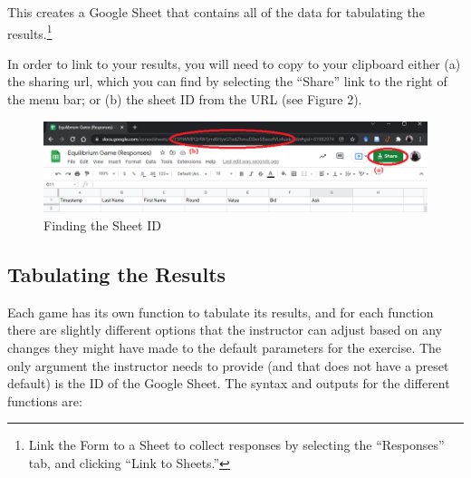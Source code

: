 \documentclass[
]{article}
\begin{document}
This creates a Google Sheet that contains all of the data for tabulating
the results.\footnote{Link the Form to a Sheet to collect responses by
  selecting the ``Responses'' tab, and clicking ``Link to Sheets.''}

In order to link to your results, you will need to copy to your
clipboard either (a) the sharing url, which you can find by selecting
the ``Share'' link to the right of the menu bar; or (b) the sheet ID
from the URL (see Figure 2).

\begin{figure}
\centering
\includegraphics{images/Figure2.png}
\caption{Finding the Sheet ID}
\end{figure}

\hypertarget{tabulating-the-results}{%
\subsection{Tabulating the Results}\label{tabulating-the-results}}

Each game has its own function to tabulate its results, and for each
function there are slightly different options that the instructor can
adjust based on any changes they might have made to the default
parameters for the exercise. The only argument the instructor needs to
provide (and that does not have a preset default) is the ID of the
Google Sheet. The syntax and outputs for the different functions are:
\end{document}
